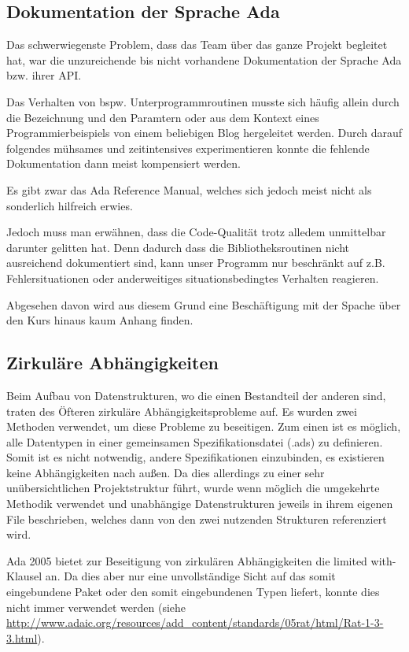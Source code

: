 \documentclass[12pt,a4paper,bibliography=totocnumbered,listof=totocnumbered]{scrartcl}
\begin{document}
\subsection{Dokumentation der Sprache Ada}
Das schwerwiegenste Problem, dass das Team über das ganze Projekt begleitet hat, war die unzureichende bis nicht vorhandene Dokumentation der Sprache Ada bzw. ihrer API.

Das Verhalten von bspw. Unterprogrammroutinen musste sich häufig allein durch die Bezeichnung und den Paramtern oder aus dem Kontext eines Programmierbeispiels von einem beliebigen Blog hergeleitet werden. Durch darauf folgendes mühsames und zeitintensives experimentieren konnte die fehlende Dokumentation dann meist kompensiert werden.

Es gibt zwar das Ada Reference Manual, welches sich jedoch meist nicht als sonderlich hilfreich erwies.

Jedoch muss man erwähnen, dass die Code-Qualität trotz alledem  unmittelbar darunter gelitten hat. Denn dadurch dass die Bibliotheksroutinen nicht ausreichend dokumentiert sind, kann unser Programm nur beschränkt auf z.B. Fehlersituationen oder anderweitiges situationsbedingtes Verhalten reagieren.

Abgesehen davon wird aus diesem Grund eine Beschäftigung mit der Spache über den Kurs hinaus kaum Anhang finden.

\subsection{Zirkuläre Abhängigkeiten}
Beim Aufbau von Datenstrukturen, wo die einen Bestandteil der anderen sind, traten des Öfteren zirkuläre Abhängigkeitsprobleme auf. Es wurden zwei Methoden verwendet, um diese Probleme zu beseitigen. Zum einen ist es möglich, alle Datentypen in einer gemeinsamen Spezifikationsdatei (.ads) zu definieren. Somit ist es nicht notwendig, andere Spezifikationen einzubinden, es existieren keine Abhängigkeiten nach außen. Da dies allerdings zu einer sehr unübersichtlichen Projektstruktur führt, wurde wenn möglich die umgekehrte Methodik verwendet und unabhängige Datenstrukturen jeweils in ihrem eigenen File beschrieben, welches dann von den zwei nutzenden Strukturen referenziert wird.

Ada 2005 bietet zur Beseitigung von zirkulären Abhängigkeiten die \glqq{}limited with\grqq{}-Klausel an. Da dies aber nur eine unvollständige Sicht auf das somit eingebundene Paket oder den somit eingebundenen Typen liefert, konnte dies nicht immer verwendet werden (siehe \url{http://www.adaic.org/resources/add_content/standards/05rat/html/Rat-1-3-3.html}).
\end{document}
